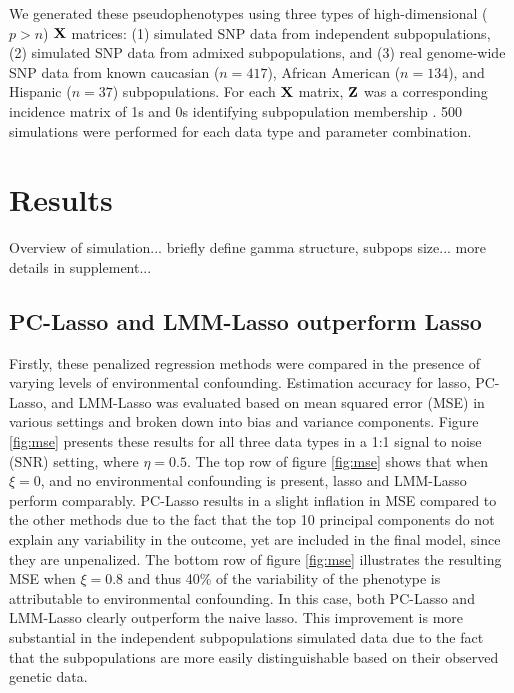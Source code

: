 We generated these pseudophenotypes using three types of high-dimensional ($p > n$) $\textbf{X}$ matrices: (1) simulated SNP data from independent subpopulations, (2) simulated SNP data from admixed subpopulations, and (3) real genome-wide SNP data from known caucasian ($n = 417$), African American ($n = 134$), and Hispanic ($n = 37$) subpopulations.  For each $\textbf{X}$ matrix, $\textbf{Z}$ was a corresponding incidence matrix of 1s and 0s identifying subpopulation membership . 500 simulations were performed for each data type and parameter combination.

\section{Results} \label{sec:results}

Overview of simulation... briefly define gamma structure, subpops size... more details in supplement...

\subsection{PC-Lasso and LMM-Lasso outperform Lasso}
Firstly, these penalized regression methods were compared in the presence of varying levels of environmental confounding. Estimation accuracy for lasso, PC-Lasso, and LMM-Lasso was evaluated based on mean squared error (MSE) in various settings and broken down into bias and variance components.  Figure \ref{fig:mse} presents these results for all three data types in a 1:1 signal to noise (SNR) setting, where $\eta = 0.5$. The top row of figure \ref{fig:mse} shows that when $\xi = 0$, and no environmental confounding is present, lasso and LMM-Lasso perform comparably. PC-Lasso results in a slight inflation in MSE compared to the other methods due to the fact that the top 10 principal components do not explain any variability in the outcome, yet are included in the final model, since they are unpenalized. The bottom row of figure \ref{fig:mse} illustrates the resulting MSE when $\xi = 0.8$ and thus 40\% of the variability of the phenotype is attributable to environmental confounding. In this case, both PC-Lasso and LMM-Lasso clearly outperform the naive lasso. This improvement is more substantial in the independent subpopulations simulated data due to the fact that the subpopulations are more easily distinguishable based on their observed genetic data.

